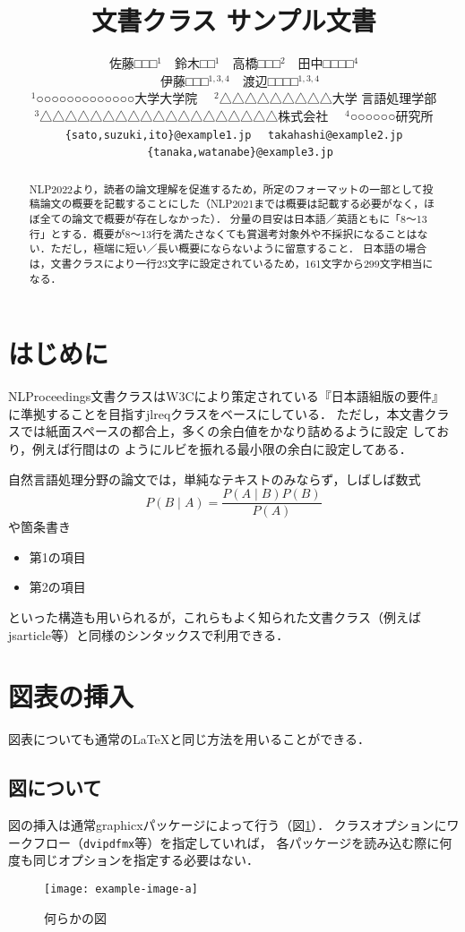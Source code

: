 \documentclass[
  platex, dvipdfmx,  %
]{rbproceedings}
\title{\pkg{NLProceedings}文書クラス サンプル文書}
\author{%
  佐藤□□□${}^{1}$　鈴木□□${}^{1}$　高橋□□□${}^{2}$　田中□□□□${}^{4}$\\
　伊藤□□□${}^{1,3,4}$　渡辺□□□□${}^{1,3,4}$\\
${}^{1}$○○○○○○○○○○○○○大学大学院
　${}^{2}$△△△△△△△△△大学 言語処理学部\\
${}^{3}$△△△△△△△△△△△△△△△△△△△株式会社 　${}^{4}$○○○○○○研究所\\ \texttt{\{sato,suzuki,ito\}@example1.jp}
　\texttt{takahashi@example2.jp}\\
　\texttt{\{tanaka,watanabe\}@example3.jp}}
\newcommand{\pkg}[1]{\textsf{#1}}
\newcommand{\code}[1]{\texttt{#1}}
\begin{document}
\maketitle

\begin{abstract}
NLP2022より，読者の論文理解を促進するため，所定のフォーマットの一部として投稿論文の概要を記載することにした（NLP2021までは概要は記載する必要がなく，ほぼ全ての論文で概要が存在しなかった）．
分量の目安は日本語／英語ともに「8〜13行」とする．概要が8〜13行を満たさなくても賞選考対象外や不採択になることはない．ただし，極端に短い／長い概要にならないように留意すること．
日本語の場合は，文書クラスにより一行23文字に設定されているため，161文字から299文字相当になる．
\end{abstract}

\section{はじめに}
\pkg{NLProceedings}文書クラスはW3Cにより策定されている『日本語組版の要件』%
\cite{JLREQ}に準拠することを目指す\pkg{jlreq}クラスをベースにしている．
ただし，本文書クラスでは紙面スペースの都合上，多くの余白値をかなり詰めるように設定
しており，例えば行間はの
ようにルビを振れる最小限の余白に設定してある．

自然言語処理分野の論文では，単純なテキストのみならず，しばしば数式
%
\begin{equation}
P(B\mid A) = \frac{P(A\mid B)P(B)}{P(A)}
\end{equation}
%
や箇条書き
%
\begin{itemize}
\item 第1の項目
\item 第2の項目
\end{itemize}
%
といった構造も用いられるが，これらもよく知られた文書クラス（例えば
\pkg{jsarticle}等）と同様のシンタックスで利用できる．

\section{図表の挿入}

図表についても通常の\LaTeX と同じ方法を用いることができる．

\subsection{図について}

図の挿入は通常\pkg{graphicx}パッケージによって行う（図\ref{fig:sample}）．
クラスオプションにワークフロー（\code{dvipdfmx}等）を指定していれば，
各パッケージを読み込む際に何度も同じオプションを指定する必要はない．
%
\begin{figure}[t]
\centering
\texttt{[image: example-image-a]}
\caption{何らかの図}
\label{fig:sample}
\end{figure}
\end{document}
